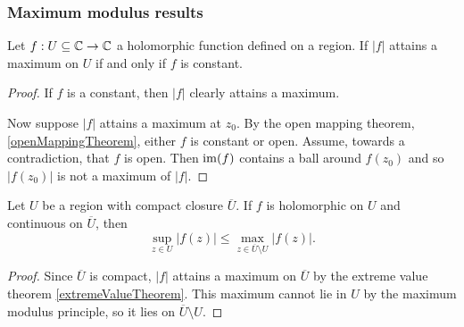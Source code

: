 \subsubsection{Maximum modulus results}
\begin{proposition} \label{maximumModulusPrinciple}
Let $f: U\subseteq \mathbb{C}\to \mathbb{C}$ a holomorphic function defined on a region. If $|f|$ attains a maximum on $U$ \textup{if and only if} $f$ is constant.
\end{proposition}
\begin{proof}
If $f$ is a constant, then $|f|$ clearly attains a maximum.

Now suppose $|f|$ attains a maximum at $z_0$. By the open mapping theorem, \ref{openMappingTheorem}, either $f$ is constant or open. Assume, towards a contradiction, that $f$ is open. Then $\operatorname{im}(f)$ contains a ball around $f(z_0)$ and so $|f(z_0)|$ is not a maximum of $|f|$.
\end{proof}
\begin{corollary}
Let $U$ be a region with compact closure $\overline{U}$. If $f$ is holomorphic on $U$ and continuous on $\overline{U}$, then
\[ \sup_{z\in U}|f(z)| \leq \max_{z\in \overline{U}\setminus U}|f(z)|. \]
\end{corollary}
\begin{proof}
Since $\overline{U}$ is compact, $|f|$ attains a maximum on $\overline{U}$ by the extreme value theorem \ref{extremeValueTheorem}. This maximum cannot lie in $U$ by the maximum modulus principle, so it lies on $\overline{U}\setminus U$.
\end{proof}

